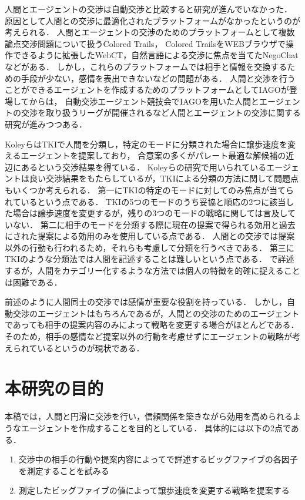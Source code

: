 人間とエージェントの交渉は自動交渉と比較すると研究が進んでいなかった．
原因として人間との交渉に最適化されたプラットフォームがなかったというのが考えられる．
人間とエージェントの交渉のためのプラットフォームとして複数論点交渉問題について扱うColored Trails\cite{ct}，
Colored TrailsをWEBブラウザで操作できるように拡張したWebCT\cite{webct}，自然言語による交渉に焦点を当てたNegoChat\cite{negochat}などがある．
しかし，これらのプラットフォームでは相手と情報を交換するための手段が少ない，感情を表出できないなどの問題がある\cite{pinocchio}．
人間と交渉を行うことができるエージェントを作成するためのプラットフォームとしてIAGO\cite{pinocchio, iago}が登場してからは，
自動交渉エージェント競技会でIAGOを用いた人間とエージェントの交渉を取り扱うリーグが開催されるなど人間とエージェントの交渉に関する研究が進みつつある\cite{hal-2017, hal-2018, hal-2019}．

Koleyら\cite{tki-ha}はTKI\cite{tki}で人間を分類し，特定のモードに分類された場合に譲歩速度を変えるエージェントを提案しており，
合意案の多くがパレート最適な解候補の近辺にあるという交渉結果を得ている．
Koleyらの研究で用いられているエージェントは良い交渉結果をもたらしているが，TKIによる分類の方法に関して問題点もいくつか考えられる．
第一にTKIの特定のモードに対してのみ焦点が当てられているという点である．
TKIの5つのモードのうち妥協と順応の2つに該当した場合は譲歩速度を変更するが，残りの3つのモードの戦略に関しては言及していない．
第二に相手のモードを分類する際に現在の提案で得られる効用と過去にされた提案による効用のみを使用している点である．
人間との交渉では提案以外の行動も行われるため，それらも考慮して分類を行うべきである．
第三にTKIのような分類法では人間を記述することは難しいという点である．
で詳述するが，人間をカテゴリー化するような方法では個人の特徴を的確に捉えることは困難である．

前述のように人間同士の交渉では感情が重要な役割を持っている．
しかし，自動交渉のエージェントはもちろんであるが，人間との交渉のためのエージェントであっても相手の提案内容のみによって戦略を変更する場合がほとんどである．
そのため，相手の感情など提案以外の行動を考慮せずにエージェントの戦略が考えられているというのが現状である．

\section{本研究の目的}
本稿では，人間と円滑に交渉を行い，信頼関係を築きながら効用を高められるようなエージェントを作成することを目的としている．
具体的には以下の2点である．

\begin{enumerate}
    \item 交渉中の相手の行動や提案内容によってで詳述するビッグファイブの各因子を測定することを試みる
    \item 測定したビッグファイブの値によって譲歩速度を変更する戦略を提案する
\end{enumerate}

